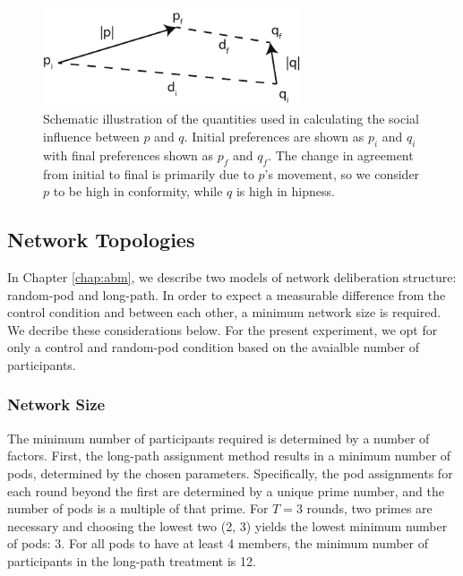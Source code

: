 \begin{figure}
\centering
\includegraphics[width=3in]{chapters/figures/NetDelibExp/fig-conform-hip-diagram.pdf}
\caption{Schematic illustration of the quantities used in calculating the social influence
between $p$ and $q$. Initial preferences are shown as $p_i$ and $q_i$ with final preferences
shown as $p_f$ and $q_f$. The change in agreement from initial to final is primarily due to
$p$'s movement, so we consider $p$ to be high in conformity, while $q$ is high in hipness.}
\label{fig:conform-hip-diagram}
\end{figure}


\subsection{Network Topologies}
In Chapter \ref{chap:abm}, we describe two models of network deliberation structure: random-pod and long-path.
In order to expect a measurable difference from the control condition and between each other, a minimum network size is required.
We decribe these considerations below.
For the present experiment, we opt for only a control and random-pod condition based on the avaialble number of participants.

\subsubsection{Network Size}
The minimum number of participants required is determined by a number of factors.
First, the long-path assignment method results in a minimum number of pods,
determined by the chosen parameters.
Specifically, the pod assignments for each round beyond the first are determined
by a unique prime number,
and the number of pods is a multiple of that prime.
For $T=3$ rounds, two primes are necessary and choosing the lowest two (2, 3)
yields the lowest minimum number of pods: 3.
For all pods to have at least 4 members, the minimum number of participants in
the long-path treatment is 12.

